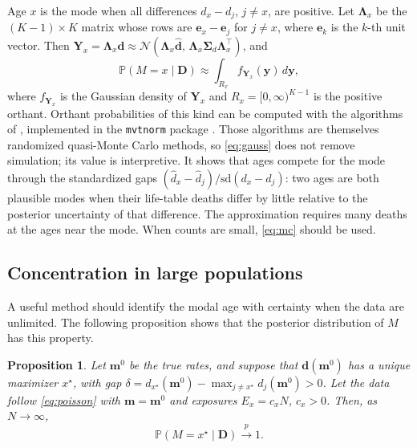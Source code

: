 \documentclass[12pt, letterpaper]{article}
\newtheorem{proposition}{Proposition}
\begin{document}
Age $x$ is the mode when all differences $d_x - d_j$, $j \neq x$, are positive. Let $\bm{\Lambda}_x$ be the $(K-1) \times K$ matrix whose rows are $\bm{e}_x - \bm{e}_j$ for $j \neq x$, where $\bm{e}_k$ is the $k$-th unit vector. Then $\bm{Y}_x = \bm{\Lambda}_x \bm{d} \approx \mathcal{N}(\bm{\Lambda}_x \hat{\bm{d}}, \, \bm{\Lambda}_x \bm{\Sigma}_d \bm{\Lambda}_x^\top)$, and
\begin{equation}
\mathbb{P}(M = x \mid \bm{D}) \approx \int_{R_x} f_{\bm{Y}_x}(\bm{y}) \, d\bm{y},
\label{eq:gauss}
\end{equation}
where $f_{\bm{Y}_x}$ is the Gaussian density of $\bm{Y}_x$ and $R_x = [0, \infty)^{K-1}$ is the positive orthant. Orthant probabilities of this kind can be computed with the algorithms of \citet{genz2009computation}, implemented in the \texttt{mvtnorm} package \citep{mi2009mvtnorm}. Those algorithms are themselves randomized quasi-Monte Carlo methods, so \eqref{eq:gauss} does not remove simulation; its value is interpretive. It shows that ages compete for the mode through the standardized gaps $(\hat d_x - \hat d_j)/\text{sd}(d_x - d_j)$: two ages are both plausible modes when their life-table deaths differ by little relative to the posterior uncertainty of that difference. The approximation requires many deaths at the ages near the mode. When counts are small, \eqref{eq:mc} should be used.

\subsection{Concentration in large populations}
\label{sec:convergence}

A useful method should identify the modal age with certainty when the data are unlimited. The following proposition shows that the posterior distribution of $M$ has this property.

\begin{proposition}
\label{prop:convergence}
Let $\bm{m}^0$ be the true rates, and suppose that $\bm{d}(\bm{m}^0)$ has a unique maximizer $x^\star$, with gap $\delta = d_{x^\star}(\bm{m}^0) - \max_{j \neq x^\star} d_j(\bm{m}^0) > 0$. Let the data follow \eqref{eq:poisson} with $\bm{m} = \bm{m}^0$ and exposures $E_x = c_x N$, $c_x > 0$. Then, as $N \to \infty$,
\[
\mathbb{P}(M = x^\star \mid \bm{D}) \xrightarrow{\;p\;} 1 .
\]
\end{proposition}
\end{document}
